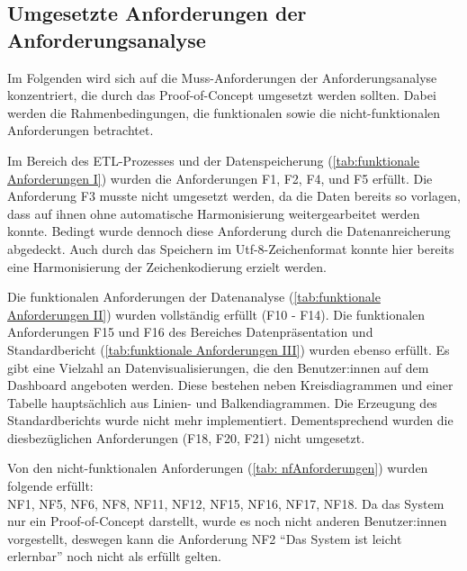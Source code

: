 \subsection{Umgesetzte Anforderungen der Anforderungsanalyse}
Im Folgenden wird sich auf die Muss-Anforderungen der Anforderungsanalyse konzentriert, die durch das Proof-of-Concept
umgesetzt werden sollten. Dabei werden die Rahmenbedingungen, die funktionalen sowie die nicht-funktionalen Anforderungen
betrachtet.

Im Bereich des ETL-Prozesses und der Datenspeicherung (\autoref{tab:funktionale Anforderungen I}) wurden die Anforderungen F1, F2, F4, und F5 erfüllt.
Die Anforderung F3 musste nicht umgesetzt werden, da die Daten bereits so vorlagen, dass auf ihnen ohne automatische Harmonisierung weitergearbeitet werden konnte.
Bedingt wurde dennoch diese Anforderung durch die Datenanreicherung abgedeckt. Auch durch das Speichern im Utf-8-Zeichenformat konnte hier bereits eine Harmonisierung der
Zeichenkodierung erzielt werden.

Die funktionalen Anforderungen der Datenanalyse (\autoref{tab:funktionale Anforderungen II}) wurden vollständig erfüllt (F10 - F14).
Die funktionalen Anforderungen F15 und F16 des Bereiches Datenpräsentation und Standardbericht (\autoref{tab:funktionale Anforderungen III}) 
wurden ebenso erfüllt. Es gibt eine Vielzahl an Datenvisualisierungen, die den Benutzer:innen auf dem Dashboard angeboten werden. 
Diese bestehen neben Kreisdiagrammen und einer Tabelle hauptsächlich aus Linien- und Balkendiagrammen.
Die Erzeugung des Standardberichts wurde nicht mehr implementiert. Dementsprechend wurden die diesbezüglichen
Anforderungen (F18, F20, F21) nicht umgesetzt. 

Von den nicht-funktionalen Anforderungen (\autoref{tab: nfAnforderungen}) wurden folgende erfüllt:\\
NF1, NF5, NF6, NF8, NF11, NF12, NF15, NF16, NF17, NF18. 
Da das System nur ein Proof-of-Concept darstellt, wurde es noch nicht anderen
Benutzer:innen vorgestellt, deswegen kann die Anforderung NF2 \enquote{Das System ist leicht erlernbar} noch nicht als erfüllt gelten.

